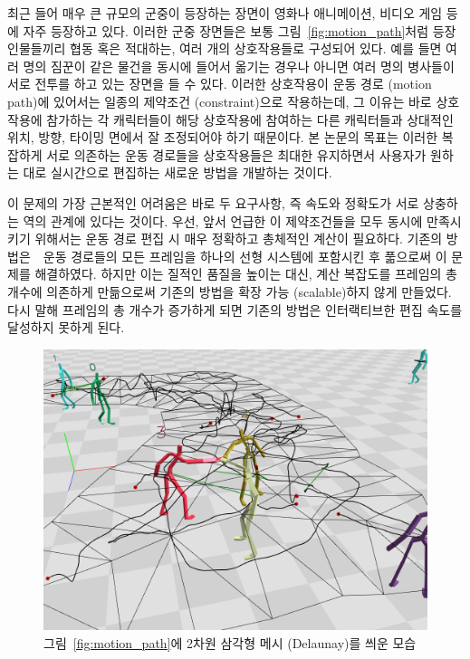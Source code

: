 \documentclass[12pt,a4paper,oneside,final]{report}
\newcommand{\Kim}{\cite{Kim:2009:SMM:1531326.1531385}}
\begin{document}
최근 들어 매우 큰 규모의 군중이 등장하는 장면이 영화나 애니메이션, 비디오 게임
등에 자주 등장하고 있다. 이러한 군중 장면들은 보통
그림~\ref{fig:motion_path}처럼 등장인물들끼리 협동 혹은 적대하는, 여러 개의
상호작용들로 구성되어 있다.  예를 들면 여러 명의 짐꾼이 같은 물건을 동시에
들어서 옮기는 경우나 아니면 여러 명의 병사들이 서로 전투를 하고 있는 장면을 들
수 있다. 이러한 상호작용이 운동 경로 (motion path)에 있어서는 일종의 제약조건
(constraint)으로 작용하는데, 그 이유는 바로 상호작용에 참가하는 각 캐릭터들이
해당 상호작용에 참여하는 다른 캐릭터들과 상대적인 위치, 방향, 타이밍 면에서 잘
조정되어야 하기 때문이다.  본 논문의 목표는 이러한 복잡하게 서로 의존하는 운동
경로들을 상호작용들은 최대한 유지하면서 사용자가 원하는 대로 실시간으로
편집하는 새로운 방법을 개발하는 것이다.

이 문제의 가장 근본적인 어려움은 바로 두 요구사항, 즉 속도와 정확도가 서로
상충하는 역의 관계에 있다는 것이다. 우선, 앞서 언급한 이 제약조건들을 모두
동시에 만족시키기 위해서는 운동 경로 편집 시 매우 정확하고 총체적인 계산이
필요하다.  기존의 방법은~\Kim~운동 경로들의 모든 프레임을 하나의 선형
시스템에 포함시킨 후 풂으로써 이 문제를 해결하였다. 하지만 이는
질적인 품질을 높이는 대신, 계산 복잡도를 프레임의 총 개수에 의존하게 만듦으로써
기존의 방법을 확장 가능 (scalable)하지 않게 만들었다. 다시 말해 프레임의 총
개수가 증가하게 되면 기존의 방법은 인터랙티브한 편집 속도를 달성하지 못하게
된다.

\begin{figure}[htb]
\centering
\includegraphics[width=0.9\linewidth]{motion_path_w_mesh_c.png}
\caption{그림~\ref{fig:motion_path}에 2차원 삼각형 메시 (Delaunay)를 씌운 모습}
\label{fig:motion_path_w_mesh}
\end{figure}
 
\end{document}
